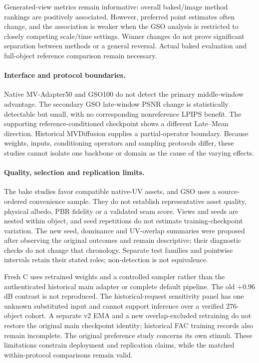 \documentclass[times,twocolumn,final]{elsarticle}
\begin{document}
Generated-view metrics remain informative: overall baked/image method rankings are positively associated. However, preferred point estimates often change, and the association is weaker when the GSO analysis is restricted to closely competing scale/time settings. Winner changes do not prove significant separation between methods or a general reversal. Actual baked evaluation and full-object reference comparison remain necessary.

\paragraph{Interface and protocol boundaries.}
Native MV-Adapter50 and GSO100 do not detect the primary middle-window advantage. The secondary GSO late-window PSNR change is statistically detectable but small, with no corresponding nonreference LPIPS benefit. The supporting reference-conditioned checkpoint shows a different Late--Mean direction. Historical MVDiffusion supplies a partial-operator boundary. Because weights, inputs, conditioning operators and sampling protocols differ, these studies cannot isolate one backbone or domain as the cause of the varying effects.

\paragraph{Quality, selection and replication limits.}
The bake studies favor compatible native-UV assets, and GSO uses a source-ordered convenience sample. They do not establish representative asset quality, physical albedo, PBR fidelity or a validated seam score. Views and seeds are nested within object, and seed repetitions do not estimate training-checkpoint variation. The new seed, dominance and UV-overlap summaries were proposed after observing the original outcomes and remain descriptive; their diagnostic checks do not change that chronology. Separate test families and pointwise intervals retain their stated roles; non-detection is not equivalence.

Fresh C uses retrained weights and a controlled sampler rather than the authenticated historical main adapter or complete default pipeline. The old $+0.96$ dB contrast is not reproduced. The historical-request sensitivity panel has one unknown substituted input and cannot support inference over a verified 276-object cohort. A separate v2 EMA and a new overlap-excluded retraining do not restore the original main checkpoint identity; historical FAC training records also remain incomplete. The original preference study concerns its own stimuli. These limitations constrain deployment and replication claims, while the matched within-protocol comparisons remain valid.
\end{document}
